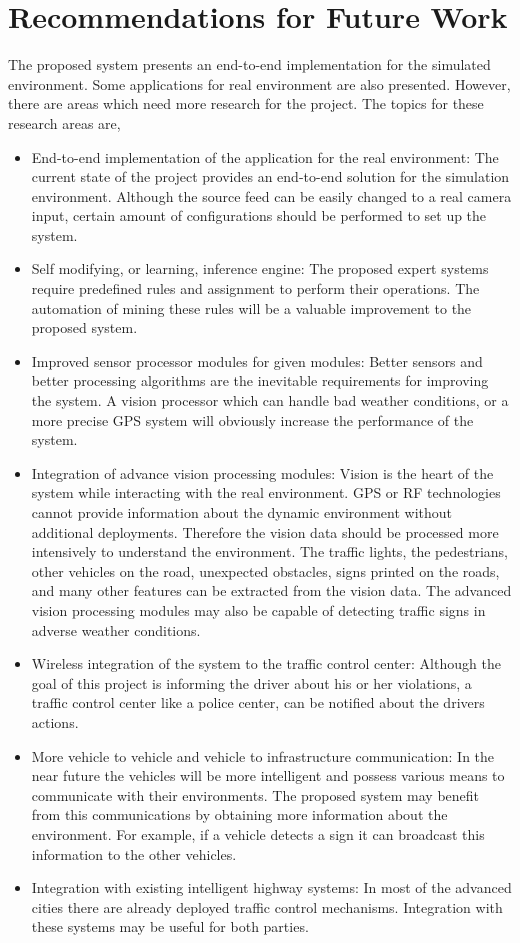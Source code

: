 \documentclass[a4paper,oneside,12pt]{report}
\begin{document}
\section{Recommendations for Future Work}
The proposed system presents an end-to-end implementation for the simulated environment. Some applications for real environment are also presented. However, there are areas which need more research for the project. The topics for these research areas are,
\begin{itemize}
	\item End-to-end implementation of the application for the real environment: The current state of the project provides an end-to-end solution for the simulation environment. Although the source feed can be easily changed to a real camera input, certain amount of configurations should be performed to set up the system.
	\item Self modifying, or learning, inference engine: The proposed expert systems require predefined rules and assignment to perform their operations. The automation of mining these rules will be a valuable improvement to the proposed system.
	\item Improved sensor processor modules for given modules: Better sensors and better processing algorithms are the inevitable requirements for improving the system. A vision processor which can handle bad weather conditions, or a more precise GPS system will obviously increase the performance of the system.
	\item Integration of advance vision processing modules: Vision is the heart of the system while interacting with the real environment. GPS or RF technologies cannot provide information about the dynamic environment without additional deployments. Therefore the vision data should be processed more intensively to understand the environment. The traffic lights, the pedestrians, other vehicles on the road, unexpected obstacles, signs printed on the roads, and many other features can be extracted from the vision data. The advanced vision processing modules may also be capable of detecting traffic signs in adverse weather conditions.
	\item Wireless integration of the system to the traffic control center: Although the goal of this project is informing the driver about his or her violations, a traffic control center like a police center, can be notified about the drivers actions.
	\item More vehicle to vehicle and vehicle to infrastructure communication: In the near future the vehicles will be more intelligent and possess various means to communicate with their environments. The proposed system may benefit from this communications by obtaining more information about the environment. For example, if a vehicle detects a sign it can broadcast this information to the other vehicles.
	\item Integration with existing intelligent highway systems: In most of the advanced cities there are already deployed traffic control mechanisms. Integration with these systems may be useful for both parties.
\end{itemize}	
\end{document}
